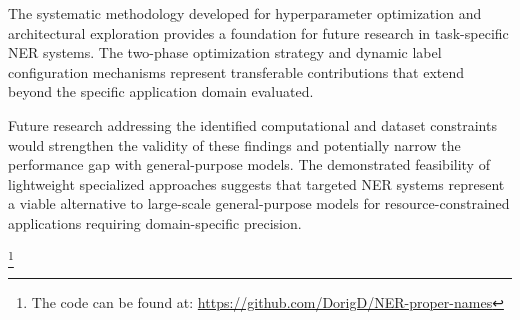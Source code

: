 \documentclass[a4paper]{usiinfbachelorproject}
\begin{document}
The systematic methodology developed for hyperparameter optimization and architectural exploration provides a foundation for future research in task-specific NER systems. The two-phase optimization strategy and dynamic label configuration mechanisms represent transferable contributions that extend beyond the specific application domain evaluated.

Future research addressing the identified computational and dataset constraints would strengthen the validity of these findings and potentially narrow the performance gap with general-purpose models. The demonstrated feasibility of lightweight specialized approaches suggests that targeted NER systems represent a viable alternative to large-scale general-purpose models for resource-constrained applications requiring domain-specific precision.

\footnote{The code can be found at: \href{https://github.com/DorigD/NER-proper-names}{https://github.com/DorigD/NER-proper-names}}







\newpage
	


\end{document}
